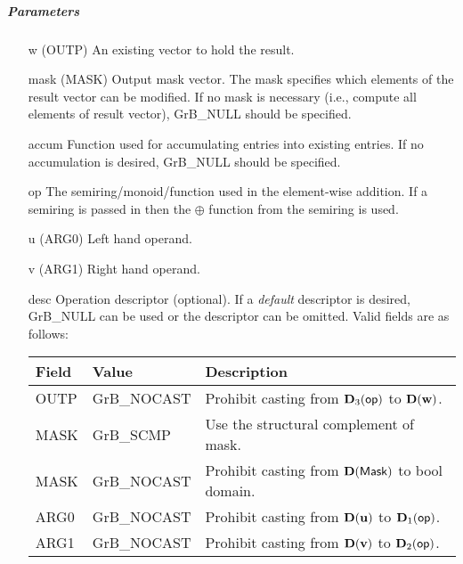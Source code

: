 \subparagraph{Parameters}

\begin{itemize}[leftmargin=1.1in]
    \item[{\sf w}]     ({\sf OUTP}) An existing vector to hold the result.

    \item[{\sf mask}] ({\sf MASK}) Output mask vector. The mask
    specifies which elements of the result vector can be modified.
    If no mask is necessary (i.e., compute all elements of result
    vector), {\sf GrB\_NULL} should be specified.

    \item[{\sf accum}]  Function used for accumulating entries into existing
                         entries. If no accumulation is desired,
                        {\sf GrB\_NULL} should be specified.

    \item[{\sf op}]    The semiring/monoid/function used in the element-wise addition.
                       If a semiring is passed in then the $\oplus$  function from
                                    the semiring is used.
    \item[{\sf u}]     ({\sf ARG0}) Left hand operand.
    \item[{\sf v}]     ({\sf ARG1}) Right hand operand.

    \item[{\sf desc}]  Operation descriptor (optional). If a
    \emph{default} descriptor is desired, {\sf GrB\_NULL} can be
    used or the descriptor can be omitted. Valid fields are as follows: \\
    \begin{tabular}{lll}
    Field  & Value & Description \\
    \hline
    {\sf OUTP} & {\sf GrB\_NOCAST} & Prohibit casting from $\bold{D}_3({\sf op})$ to $\bold{D}({\bf w})$. \\
    {\sf MASK} & {\sf GrB\_SCMP} & Use the structural complement of {\sf mask}. \\
    {\sf MASK} & {\sf GrB\_NOCAST} & Prohibit casting from $\bold{D}({\sf Mask})$ to {\sf bool} domain. \\
    {\sf ARG0} & {\sf GrB\_NOCAST} & Prohibit casting from $\bold{D}({\bf u})$ to $\bold{D}_1({\sf op})$. \\
    {\sf ARG1} & {\sf GrB\_NOCAST} & Prohibit casting from $\bold{D}({\bf v})$ to $\bold{D}_2({\sf op})$. \\
    \end{tabular}
\end{itemize}

